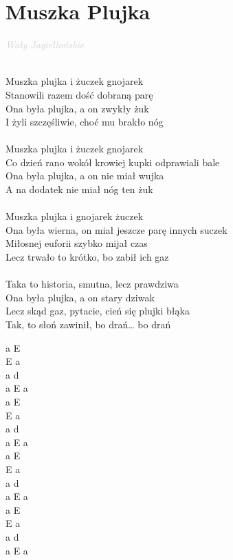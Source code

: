 \documentclass[a5paper, 10pt]{book}
\begin{document}
\section{Muszka Plujka}\textcolor{lightgray}{\textit{Wały Jagiellońskie}}\\~\\
\begin{minipage}[t]{0.8\textwidth}
  Muszka plujka i żuczek gnojarek 					\\
  Stanowili razem dość dobraną parę					\\
  Ona była plujka, a on zwykły żuk					\\
  I żyli szczęśliwie, choć mu brakło nóg				\\
  \\
  Muszka plujka i żuczek gnojarek\\
  Co dzień rano wokół krowiej kupki odprawiali bale\\
  Ona była plujka, a on nie miał wujka\\
  A na dodatek nie miał nóg ten żuk\\
  \\
  Muszka plujka i gnojarek żuczek\\
  Ona była wierna, on miał jeszcze parę innych suczek\\
  Miłosnej euforii szybko mijał czas\\
  Lecz trwało to krótko, bo zabił ich gaz\\
  \\
  Taka to historia, smutna, lecz prawdziwa\\
  Ona była plujka, a on stary dziwak\\
  Lecz skąd gaz, pytacie, cień się plujki błąka\\
  Tak, to słoń zawinił, bo drań… bo drań\\
\end{minipage}
\begin{minipage}[t]{0.2\textwidth}
  a E \\
  E a \\
  a d \\
  a E a\\

  a E \\
  E a \\
  a d \\
  a E a\\

  a E \\
  E a \\
  a d \\
  a E a\\

  a E \\
  E a \\
  a d \\
  a E a\\
\end{minipage}
\end{document}
